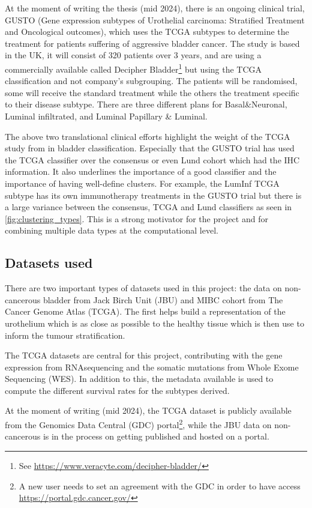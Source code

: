 At the moment of writing the thesis (mid 2024), there is an ongoing clinical trial, GUSTO (Gene expression subtypes of Urothelial carcinoma: Stratified Treatment and Oncological outcomes), which uses the TCGA subtypes to determine the treatment for patients suffering of aggressive bladder cancer. The study is based in the UK, it will consist of 320 patients over 3 years, and are using a commercially available called Decipher Bladder\footnote{See \url{https://www.veracyte.com/decipher-bladder/}} but using the TCGA classification and not company's subgrouping\cite{Griffin2024-zr}. The patients will be randomised, some will receive the standard treatment while the others the treatment specific to their disease subtype. There are three different plans for Basal\&Neuronal, Luminal infiltrated, and Luminal Papillary \& Luminal.

The above two translational clinical efforts highlight the weight of the TCGA study from \citet{Robertson2017-mg} in bladder classification. Especially that the GUSTO trial has used the TCGA classifier over the consensus or even Lund cohort which had the IHC information. It also underlines the importance of a good classifier and the importance of having well-define clusters. For example, the LumInf TCGA subtype has its own immunotherapy treatments in the GUSTO trial \citet{Griffin2024-zr} but there is a large variance between the consensus, TCGA and Lund classifiers as seen in \cref{fig:clustering_types}. This is a strong motivator for the project and for combining multiple data types at the computational level.


\subsection{Datasets used}

There are two important types of datasets used in this project: the data on non-cancerous bladder from Jack Birch Unit (JBU) and MIBC cohort from The Cancer Genome Atlas (TCGA). The first helps build a representation of the urothelium which is as close as possible to the healthy tissue which is then use to inform the tumour stratification.

The TCGA datasets are central for this project, contributing with the gene expression from RNAsequencing and the somatic mutations from Whole Exome Sequencing (WES). In addition to this, the metadata available is used to compute the different survival rates for the subtypes derived. 

At the moment of writing (mid 2024), the TCGA dataset is publicly available from the Genomics Data Central (GDC) portal\footnote{A new user needs to set an agreement with the GDC in order to have access \url{https://portal.gdc.cancer.gov/}}, while the JBU data on non-cancerous is in the process on getting published and hosted on a portal.

